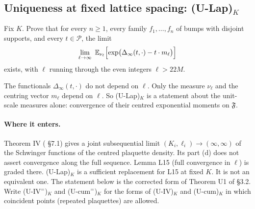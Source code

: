 \subsection{Uniqueness at fixed lattice spacing: (U-Lap)$_K$}\label{sec:open-ulap}

\begin{problem}\label{prob:ULap}
Fix $K$. Prove that for every $n\ge1$, every family $f_1,\dots,f_n$ of bumps with disjoint supports, and every $t\in\mathcal P$, the limit
\[
\lim_{\ell\to\infty}\ \mathbb E_{\nu_\ell}\Bigl[\exp\bigl(\Delta_\infty(t,\cdot)-t\cdot m_\ell\bigr)\Bigr]
\]
exists, with $\ell$ running through the even integers $\ell>22M$.
\end{problem}

The functionals $\Delta_\infty(t,\cdot)$ do not depend on $\ell$. Only the measure $\nu_\ell$ and the centring vector $m_\ell$ depend on $\ell$. So (U-Lap)$_K$ is a statement about the unit-scale measures alone: convergence of their centred exponential moments on $\mathfrak F$.

\paragraph{Where it enters.} Theorem IV ( \S7.1) gives a joint subsequential limit $(K_i,\ell_i)\to(\infty,\infty)$ of the Schwinger functions of the centred plaquette density. Its part (d) does not assert convergence along the full sequence. Lemma L15 (full convergence in $\ell$) is graded  there. (U-Lap)$_K$ is a sufficient replacement for L15 at fixed $K$. It is not an equivalent one. The statement below is the corrected form of Theorem U1 of  \S3.2. Write (U-IV$^=$)$_K$ and (U-cum$^=$)$_K$ for the forms of (U-IV)$_K$ and (U-cum)$_K$ in which coincident points (repeated plaquettes) are allowed.

